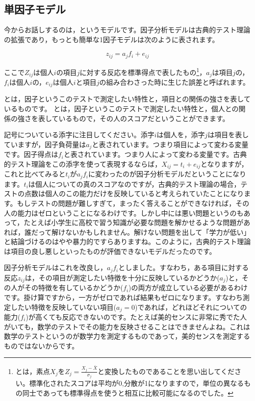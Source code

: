 \documentclass{ltjsbook}
\begin{document}
\subsection{単因子モデル}
今からお話しするのは，というモデルです。因子分析モデルは古典的テスト理論の拡張であり，もっとも簡単な1因子モデルは次のように表されます。

\[ z_{ij} = a_j f_i + e_{ij} \]

ここで$Z_{ij}$は個人$i$の項目$j$に対する反応を標準得点で表したもの\footnote{とは，素点$X_j$を$Z_j = \frac{X_j - \bar{X}}{\sigma_j}$と変換したものであることを思い出してください。標準化されたスコアは平均が0,分散が1になりますので，単位の異なるもの同士であっても標準得点を使うと相互に比較可能になるのでした。}，$a_j$は項目$j$の，$f_i$は個人$i$の，$e_{ij}$は個人$i$と項目$j$の組み合わさった時に生じた誤差と呼ばれます。

とは，因子というこのテストで測定したい特性と，項目との関係の強さを表しているものです。
とは，因子というこのテストで測定したい特性と，個人との関係の強さを表しているもので，その人のスコアだということができます。

記号についている添字に注目してください。添字$i$は個人を，添字$j$は項目を表していますが，因子負荷量は$a_j$と表されています。つまり項目によって変わる変量です。因子得点は$f_i$と表されています。つまり人によって変わる変量です。古典的テスト理論をこの添字を使って表現するならば，$X_{ij} = t_i + e_{ij}$となりますが，これと比べてみると$t_i$が$a_jf_i$に変わったのが因子分析モデルだということになります。$t_i$は個人についての真のスコアなのですが，古典的テスト理論の場合，テストの点数は個人のこの能力だけを反映していると考えられていたことになります。もしテストの問題が難しすぎて，まったく答えることができなければ，その人の能力はゼロということになるわけです。しかし中には悪い問題というのもあって，たとえば小学生に高校で習う知識が必要な問題を解かせるような問題があれば，誰だって解けないかもしれません。解けない問題を出して「学力が低い」と結論づけるのはやや暴力的ですらありますね。このように，古典的テスト理論は項目の良し悪しといったものが評価できないモデルだったのです。

因子分析モデルはこれを改良し，$a_j f_i$としました。すなわち，ある項目に対する反応$z_{ij}$は，その項目が測定したい特徴を十分に反映しているかどうか($a_j$)と，その人がその特徴を有しているかどうか($f_i$)の両方が成立している必要があるわけです。掛け算ですから，一方がゼロであれば結果もゼロになります。すなわち測定したい特徴を反映していない項目($a_j=0$)であれば，どれほどそれについての能力($f_i$)が高くても反応できないのです。たとえば美的センスに非常に秀でた人がいても，数学のテストでその能力を反映させることはできませんよね。これは数学のテストというのが数学力を測定するものであって，美的センスを測定するものではないからです。
\end{document}
